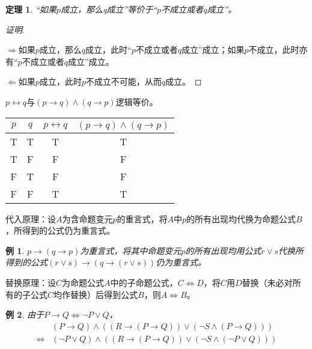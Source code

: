 \documentclass{article}
\newtheorem*{Thm}{定理}
\newtheorem*{Example}{例}
\begin{document}
\begin{CJK}{UTF8}{gbsn}
  \begin{Thm}
“如果$p$成立，那么q成立”等价于“$p$不成立或者$q$成立”。
  \end{Thm}
  \begin{proof}[证明]$\quad$


    $\Rightarrow$如果$p$成立，那么$q$成立，此时“$p$不成立或者$q$成立”成立；如果$p$不成立，此时亦有“$p$不成立或者$q$成立”成立。

$\Leftarrow$如果$p$成立，此时$p$不成立不可能，从而$q$成立。
  \end{proof}

  

  $p\leftrightarrow q$与$(p\to q) \land (q \to p)$逻辑等价。

  \begin{tabular}{cc|cc}
    $p$& $q$&$p \leftrightarrow q$&$(p\to q) \land (q \to p)$\\
    \hline
    T&T&T&T\\
    T&F&F&F\\
    F&T&F&F\\
    F&F&T&T\\      
  \end{tabular}
  
  代入原理：设$A$为含命题变元$p$的重言式，将$A$中$p$的所有出现均代换为命题公式$B$，所得到的公式仍为重言式。


  \begin{Example}
    $p\to (q\to p)$为重言式，将其中命题变元$p$的所有出现均用公式$r\lor s$代换所得到的公式$(r\lor s)\to (q\to (r\lor s))$仍为重言式。
  \end{Example}
  替换原理：设$C$为命题公式$A$中的子命题公式，$C\Leftrightarrow D$，将$C$用$D$替换（未必对所有的子公式$C$均作替换）后得到公式$B$，则$A\Leftrightarrow B$。

  \begin{Example}
    由于$P\to Q \Leftrightarrow \lnot P \lor Q$，
    \begin{align*}
      &(P\to Q)\land ((R\to (P\to Q))\lor(\lnot S \land (P\to Q)))\\
      \Leftrightarrow&(\lnot P \lor Q)\land ((R\to (P\to Q))\lor(\lnot S \land (\lnot P\lor Q)))
    \end{align*}

  \end{Example}


\end{CJK}
\end{document}
